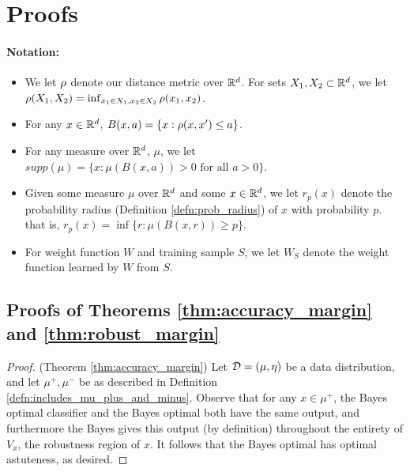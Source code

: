 \section{Proofs}

\paragraph{Notation:} \begin{itemize}
	\item We let $\rho$ denote our distance metric over $\mathbb R^d$. For sets $X_1, X_2 \subset \mathbb R^d$, we let $\rho(X_1, X_2) = \inf_{x_1 \in X_1, x_2 \in X_2} \rho(x_1, x_2)$. 
	\item For any $x \in \mathbb R^d$, $B(x, a) = \{x: \rho(x, x') \leq a\}$.
	\item For any measure over $\mathbb R^d$, $\mu$, we let $supp(\mu) = \{x: \mu(B(x,a)) > 0\text{ for all }a > 0\}.$ 
	\item Given some measure $\mu$ over $\mathbb R^d$ and some $x \in \mathbb R^d$, we let $r_p(x)$ denote the probability radius (Definition \ref{defn:prob_radius}) of $x$ with probability $p$. that is, $r_p(x) = \inf \{r: \mu(B(x,r)) \geq p\}.$
	\item For weight function $W$ and training sample $S$, we let $W_S$ denote the weight function learned by $W$ from $S$.
\end{itemize}

\subsection{Proofs of Theorems \ref{thm:accuracy_margin} and \ref{thm:robust_margin}}

\begin{proof}
(Theorem \ref{thm:accuracy_margin}) Let ${\mathcal D} = (\mu, \eta)$ be a data distribution, and let $\mu^+, \mu^-$ be as described in Definition \ref{defn:includes_mu_plus_and_minus}. Observe that for any $x \in \mu^+$, the Bayes optimal classifier and the \natural\emph{ }Bayes optimal both have the same output, and furthermore the \natural\emph{ }Bayes gives this output (by definition) throughout the entirety of $V_x$, the \natural\emph{ }robustness region of $x$. It follows that the \natural\emph{ }Bayes optimal has optimal astuteness, as desired. 
\end{proof}

